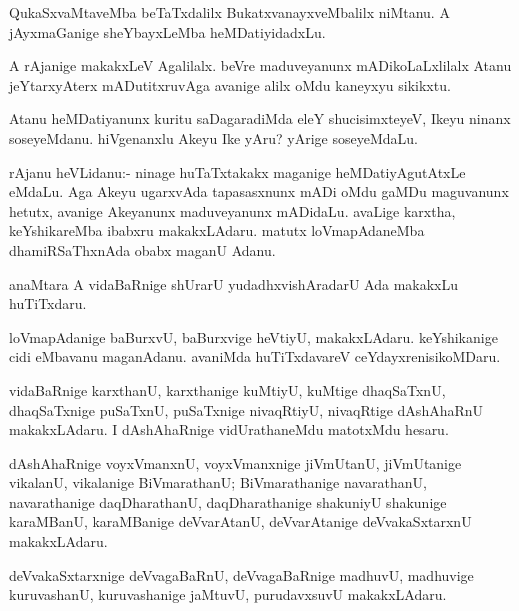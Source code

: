 \documentclass{article}
\begin{document}
\begin{mn}
QukaSxvaMtaveMba beTaTxdalilx BukatxvanayxveMbalilx niMtanu. A
jAyxmaGanige sheYbayxLeMba heMDatiyidadxLu.
\end{mn}

\begin{mn}%
A rAjanige makakxLeV Agalilalx. beVre maduveyanunx mADikoLaLxlilalx
Atanu jeYtarxyAterx mADutitxruvAga avanige alilx oMdu kaneyxyu sikikxtu.
\end{mn}

\begin{mn}
Atanu heMDatiyanunx kuritu saDagaradiMda eleY shucisimxteyeV, Ikeyu
ninanx soseyeMdanu. hiVgenanxlu Akeyu Ike yAru? yArige soseyeMdaLu.
\end{mn}

\begin{mn}%
rAjanu heVLidanu:- ninage huTaTxtakakx maganige heMDatiyAgutAtxLe
eMdaLu. Aga Akeyu ugarxvAda tapasasxnunx mADi oMdu gaMDu maguvanunx
hetutx, avanige Akeyanunx maduveyanunx mADidaLu. avaLige karxtha,
keYshikareMba ibabxru makakxLAdaru. matutx loVmapAdaneMba
dhamiRSaThxnAda obabx maganU Adanu.
\end{mn}

\begin{mn}
anaMtara A vidaBaRnige shUrarU yudadhxvishAradarU Ada makakxLu huTiTxdaru.
\end{mn}

\begin{mn}%
loVmapAdanige baBurxvU, baBurxvige heVtiyU, makakxLAdaru. keYshikanige
cidi eMbavanu maganAdanu. avaniMda huTiTxdavareV ceYdayxrenisikoMDaru.
\end{mn}

\begin{mn}%
vidaBaRnige karxthanU, karxthanige kuMtiyU, kuMtige dhaqSaTxnU,
dhaqSaTxnige puSaTxnU, puSaTxnige nivaqRtiyU, nivaqRtige dAshAhaRnU
makakxLAdaru. I dAshAhaRnige vidUrathaneMdu matotxMdu hesaru.
\end{mn}

\begin{mn}
dAshAhaRnige voyxVmanxnU, voyxVmanxnige jiVmUtanU, jiVmUtanige
vikalanU, vikalanige BiVmarathanU; BiVmarathanige navarathanU,
navarathanige daqDharathanU, daqDharathanige shakuniyU shakunige
karaMBanU, karaMBanige deVvarAtanU, deVvarAtanige deVvakaSxtarxnU makakxLAdaru.
\end{mn}

\begin{mn}%
deVvakaSxtarxnige deVvagaBaRnU, deVvagaBaRnige madhuvU, madhuvige
kuruvashanU, kuruvashanige jaMtuvU, purudavxsuvU makakxLAdaru.
\end{mn}
\end{document}
